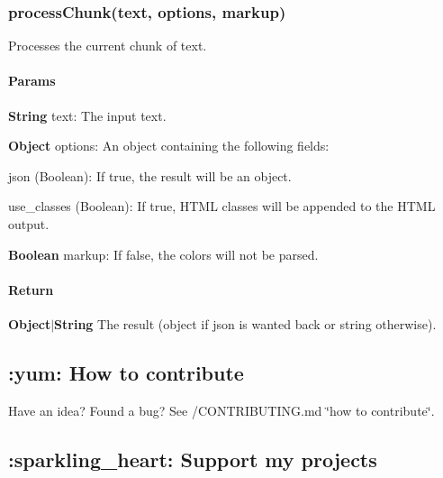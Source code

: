 \subsubsection*{{\ttfamily process\+Chunk(text, options, markup)}}

Processes the current chunk of text.

\paragraph*{Params}


\begin{DoxyItemize}
\item {\bfseries String} {\ttfamily text}\+: The input text.
\item {\bfseries Object} {\ttfamily options}\+: An object containing the following fields\+:
\begin{DoxyItemize}
\item {\ttfamily json} (Boolean)\+: If {\ttfamily true}, the result will be an object.
\item {\ttfamily use\+\_\+classes} (Boolean)\+: If {\ttfamily true}, H\+T\+ML classes will be appended to the H\+T\+ML output.
\end{DoxyItemize}
\item {\bfseries Boolean} {\ttfamily markup}\+: If false, the colors will not be parsed.
\end{DoxyItemize}

\paragraph*{Return}


\begin{DoxyItemize}
\item {\bfseries Object$\vert$\+String} The result (object if {\ttfamily json} is wanted back or string otherwise).
\end{DoxyItemize}

\subsection*{\+:yum\+: How to contribute}

Have an idea? Found a bug? See /\+C\+O\+N\+T\+R\+I\+B\+U\+T\+I\+NG.md \char`\"{}how to contribute\char`\"{}.

\subsection*{\+:sparkling\+\_\+heart\+: Support my projects}

